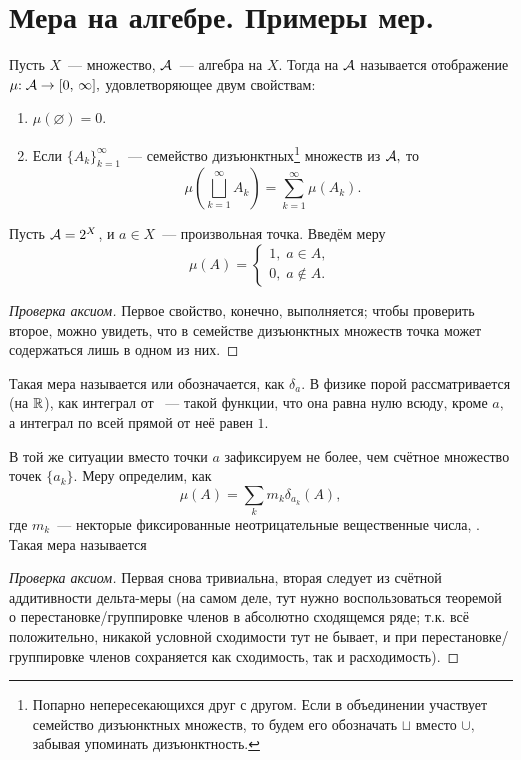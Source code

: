 \documentclass{notes}
\begin{document}
\section{Мера на алгебре. Примеры мер.}

	\begin{de}
		Пусть $X$~--- множество, $\mathcal{A}$~--- алгебра на $X$. Тогда  на $\mathcal{A}$ называется отображение $\mu \text{\text{:}} \; \mathcal{A} \to [0, \, \infty],$ удовлетворяющее двум свойствам:
		\begin{enumerate}
			\item $\mu(\varnothing) = 0.$
			\item Если $\{A_k\}_{k = 1}^{\infty}$~--- семейство дизъюнктных\footnote{Попарно непересекающихся друг с другом. Если в объединении участвует семейство дизъюнктных множеств, то будем его обозначать $\sqcup$ вместо $\cup,$ забывая упоминать дизъюнктность.} множеств из $\mathcal{A},$ то 
			\[
				\mu \left(\bigsqcup\limits_{k = 1}^{\infty} A_k\right) = \sum\limits_{k = 1}^{\infty} \mu(A_k).
			\]
		\end{enumerate}
	\end{de}

	\begin{exm}
		Пусть $\mathcal{A} = 2^{X}$, и $a \in X$~--- произвольная точка. Введём меру
		\[
			\mu(A) = \begin{cases}
				1, \; a \in A, \\
				0, \; a \notin A.
			\end{cases}
		\]
			\begin{proof}[Проверка аксиом]
				Первое свойство, конечно, выполняется; чтобы проверить второе, можно увидеть, что в семействе дизъюнктных множеств точка может содержаться лишь в одном из них. 
			\end{proof}
		Такая мера называется  или  обозначается, как $\delta_a$. В физике порой рассматривается (на $\mathbb{R}$), как интеграл от ~--- такой функции, что она равна нулю всюду, кроме $a,$ а интеграл по всей прямой от неё равен $1$.
	\end{exm}

	\begin{exm}
		В той же ситуации вместо точки $a$ зафиксируем не более, чем счётное множество точек $\{a_k\}$. Меру определим, как
		\[
			\mu(A) = \sum \limits_{k} m_k \delta_{a_k}(A),
		\]
		где $m_k$~--- некторые фиксированные неотрицательные вещественные числа, . Такая мера называется\ti{молекулярной.}
		\begin{proof}[Проверка аксиом]
			Первая снова тривиальна, вторая следует из счётной аддитивности дельта-меры (на самом деле, тут нужно воспользоваться теоремой о перестановке/группировке членов в абсолютно сходящемся ряде; т.к. всё положительно, никакой условной сходимости тут не бывает, и при перестановке/группировке членов сохраняется как сходимость, так и расходимость).
		\end{proof}
	\end{exm}
\end{document}
